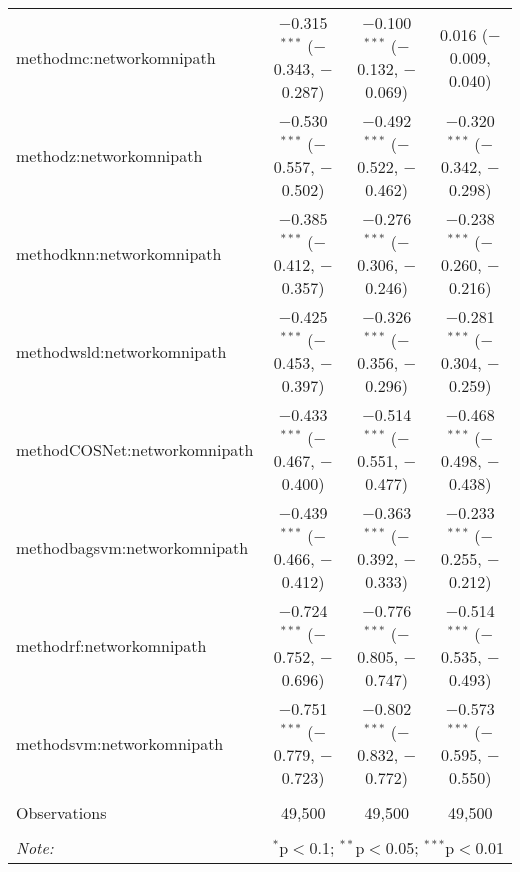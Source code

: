 \begin{table}[!htbp]
\begin{tabular}{@{\extracolsep{5pt}}lccc}
  methodmc:networkomnipath & $-$0.315$^{***}$ ($-$0.343, $-$0.287) & $-$0.100$^{***}$ ($-$0.132, $-$0.069) & 0.016 ($-$0.009, 0.040) \\ 
  methodz:networkomnipath & $-$0.530$^{***}$ ($-$0.557, $-$0.502) & $-$0.492$^{***}$ ($-$0.522, $-$0.462) & $-$0.320$^{***}$ ($-$0.342, $-$0.298) \\ 
  methodknn:networkomnipath & $-$0.385$^{***}$ ($-$0.412, $-$0.357) & $-$0.276$^{***}$ ($-$0.306, $-$0.246) & $-$0.238$^{***}$ ($-$0.260, $-$0.216) \\ 
  methodwsld:networkomnipath & $-$0.425$^{***}$ ($-$0.453, $-$0.397) & $-$0.326$^{***}$ ($-$0.356, $-$0.296) & $-$0.281$^{***}$ ($-$0.304, $-$0.259) \\ 
  methodCOSNet:networkomnipath & $-$0.433$^{***}$ ($-$0.467, $-$0.400) & $-$0.514$^{***}$ ($-$0.551, $-$0.477) & $-$0.468$^{***}$ ($-$0.498, $-$0.438) \\ 
  methodbagsvm:networkomnipath & $-$0.439$^{***}$ ($-$0.466, $-$0.412) & $-$0.363$^{***}$ ($-$0.392, $-$0.333) & $-$0.233$^{***}$ ($-$0.255, $-$0.212) \\ 
  methodrf:networkomnipath & $-$0.724$^{***}$ ($-$0.752, $-$0.696) & $-$0.776$^{***}$ ($-$0.805, $-$0.747) & $-$0.514$^{***}$ ($-$0.535, $-$0.493) \\ 
  methodsvm:networkomnipath & $-$0.751$^{***}$ ($-$0.779, $-$0.723) & $-$0.802$^{***}$ ($-$0.832, $-$0.772) & $-$0.573$^{***}$ ($-$0.595, $-$0.550) \\ 
 \hline \\[-1.8ex] 
Observations & 49,500 & 49,500 & 49,500 \\ 
\hline 
\hline \\[-1.8ex] 
\textit{Note:}  & \multicolumn{3}{r}{$^{*}$p$<$0.1; $^{**}$p$<$0.05; $^{***}$p$<$0.01} \\ 
\end{tabular} 
\end{table} 
